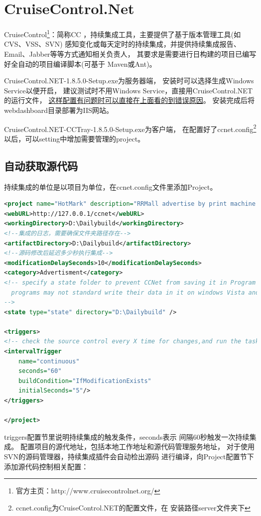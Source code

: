 \documentclass{book}
\begin{document}
\section{CruiseControl.Net}

CruiseControl\footnote{官方主页：http://www.cruisecontrolnet.org/}：简称CC ，持续集成工具，主要提供了基于版本管理工具(如CVS、VSS、SVN) 感知变化或每天定时的持续集成，并提供持续集成报告、Email、Jabber等等方式通知相关负责人，
其要求是需要进行日构建的项目已编写好全自动的项目编译脚本(可基于 Maven或Ant)。

CruiseControl.NET-1.8.5.0-Setup.exe为服务器端，
安装时可以选择生成Windows Service以便开启，
建议测试时不用Windows Service，直接用CruiseControl.NET 的运行文件，
\underline{这样配置有问题时可以直接在上面看的到错误原因}。
安装完成后将webdashboard目录部署为IIS网站。

CruiseControl.NET-CCTray-1.8.5.0-Setup.exe为客户端，
在配置好了ccnet.config\footnote{ccnet.config为CruiseControl.NET的配置文件，在
安装路径server文件夹下}以后，可以setting中增加需要管理的project。

\subsection{自动获取源代码}

持续集成的单位是以项目为单位，在ccnet.config文件里添加Project。

\begin{lstlisting}[language=XML]
<project name="HotMark" description="RRMall advertise by print machine." queue="Q1">
<webURL>http://127.0.0.1/ccnet</webURL>
<workingDirectory>D:\Dailybuild</workingDirectory>	
<!--集成的日志，需要确保文件夹路径存在-->
<artifactDirectory>D:\Dailybuild</artifactDirectory>	
<!--源码修改后延迟多少秒执行集成-->
<modificationDelaySeconds>10</modificationDelaySeconds>
<category>Advertisment</category>	
<!-- specify a state folder to prevent CCNet from saving it in Program Files\CruiseControl.NET\server 
  programs may not standard write their data in it on windows Vista and up)
-->
<state type="state" directory="D:\Dailybuild" /> 

<triggers>
<!-- check the source control every X time for changes,and run the tasks if changes are found -->
<intervalTrigger
	name="continuous"
	seconds="60"
	buildCondition="IfModificationExists"
	initialSeconds="5"/>
</triggers>

</project>
\end{lstlisting}

triggers配置节里说明持续集成的触发条件，seconds表示
间隔60秒触发一次持续集成。
配置项目的源代地址，包括本地工作地址和源代码管理服务地址，
对于使用SVN的源码管理器，持续集成插件会自动检出源码
进行编译，向Project配置节下添加源代码控制相关配置：
\end{document}
